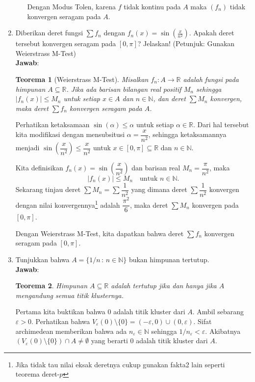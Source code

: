 \documentclass[12pt,openany,a4paper]{article}
\newtheorem*{teorema}{Teorema}
\newcommand{\R}{\mathbb{R}}
\newcommand{\N}{\mathbb{N}}
\newcommand{\jawab}{\textbf{Jawab}:}
\begin{document}
\begin{enumerate}
\begin{enumerate}
            Dengan Modus Tolen, karena $f$ tidak kontinu pada $A$ maka $(f_n)$ tidak konvergen seragam pada $A$.
    \end{enumerate}
    \item Diberikan deret fungsi $\sum f_n$ dengan $f_n(x)=\sin(\frac{x}{n^2})$. Apakah deret 
    tersebut konvergen seragam pada $[0,\pi]$? Jelaskan! (Petunjuk: Gunakan Weierstrass M-Test)\\
    \jawab
    \begin{teorema}[Weierstrass M-Test]
        Misalkan $f_n : A \to \R$ adalah fungsi pada himpunan $A \subseteq \R$. Jika ada barisan 
        bilangan real positif $M_n$ sehingga $|f_n(x)| \leq M_n$ untuk setiap $x \in A$ dan $n \in \N$, 
        dan deret $\sum M_n$ konvergen, maka deret $\sum f_n$ konvergen seragam pada $A$.
    \end{teorema}
    Perhatikan ketaksamaan $\sin(\alpha)\leq \alpha$ untuk setiap $\alpha\in\R$. Dari hal tersebut 
    kita modifikasi dengan mensubsitusi $\alpha=\dfrac{x}{n^2}$, sehingga ketaksamannya menjadi 
    $\sin\left(\dfrac{x}{n^2}\right)\leq \dfrac{x}{n^2}$ untuk $x\in[0,\pi]\subseteq\R$ dan $n\in\N$.

    Kita definisikan $f_n(x)=\sin\left(\dfrac{x}{n^2}\right)$ dan barisan real $M_n=\dfrac{\pi}{n^2}$, maka
    \[|f_n(x)|\leq M_n\quad\text{untuk } n\in\N.\]
    Sekarang tinjau deret $\sum M_n=\displaystyle\sum\dfrac{1}{n^2}$ yang dimana deret $\displaystyle\sum\dfrac{1}{n^2}$ konvergen 
    dengan nilai konvergennya\footnote{Jika tidak tau nilai eksak deretnya cukup gunakan fakta2 lain seperti teorema deret-$p$} adalah $\dfrac{\pi^2}{6}$, maka deret $\sum M_n$ konvergen pada $[0,\pi]$.

    Dengan Weierstrass M-Test, kita dapatkan bahwa deret $\sum f_n$ konvergen seragam pada $[0,\pi]$.

    \item Tunjukkan bahwa $A=\{1/n\,:\,n\in \N\}$ bukan himpunan tertutup.\\
    \jawab
    \begin{teorema}
        Himpunan $A\subseteq\R$ adalah tertutup jika dan hanya jika $A$ mengandung semua titik klusternya.
    \end{teorema}
    Pertama kita buktikan bahwa $0$ adalah titik kluster dari $A$. Ambil
    sebarang $\varepsilon > 0$. Perhatikan bahwa $V_\varepsilon(0)\setminus \{0\} = (-\varepsilon, 0)\cup(0, \varepsilon)$.
    Sifat archimedean memberikan bahwa ada $n_\varepsilon\in\N$ sehingga $1/n_\varepsilon<\varepsilon$. 
    Akibatnya $(V_\varepsilon(0)\setminus \{0\})\cap A\ne \emptyset$ yang berarti $0$ adalah titik kluster dari $A$.


\end{enumerate}
\end{document}
